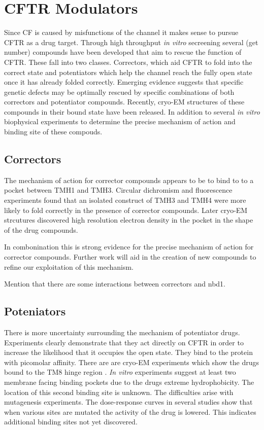 \section{CFTR Modulators}
Since CF is caused by misfunctions of the channel it makes sense to pursue CFTR as a drug target. Through high throughput \textit{in vitro} secreening several (get number) compounds have been developed that aim to rescue the function of CFTR. These fall into two classes. Correctors, which aid CFTR to fold into the correct state and potentiators which help the channel reach the fully open state once it has already folded correctly. Emerging evidence suggests that specific genetic defects may be optimally rescued by specific combinations of both correctors and potentiator compounds. Recently, cryo-EM structures of these compounds in their bound state have been released. In addition to several \textit {in vitro} biophysical experiments to determine the precise mechanism of action and binding site of these compouds.

\subsection{Correctors}
The mechanism of action for corrector compounds appears to be to bind to to a pocket between TMH1 and TMH3. Circular dichromism and fluorescence experiments found that an isolated construct of TMH3 and TMH4 were more likely to fold correctly in the presence of corrector compounds. Later cryo-EM strcutures discovered high resolution electron density in the pocket in the shape of the drug compounds. 

In combonination this is strong evidence for the precise mechanism of action for corrector compounds. Further work will aid in the creation of new compounds to refine our exploitation of this mechanism.

Mention that there are some interactions between correctors and nbd1.

\subsection{Poteniators}
There is more uncertainty surrounding the mechanism of potentiator drugs. Experiments clearly demonstrate that they act directly on CFTR in order to increase the likelihood that it occupies the open state. They bind to the protein with picomolar affinity. There are are cryo-EM experiments which show the drugs bound to the TM8 hinge region \cite{}. \textit {In vitro} experiments suggest at least two membrane facing binding pockets due to the drugs extreme hydrophobicity\cite{}. The location of this second binding site is unknown. The difficulties arise with mutagenesis experiments. The dose-response curves in several studies show that when various sites are mutated the activity of the drug is lowered. This indicates additional binding sites not yet discovered. 

